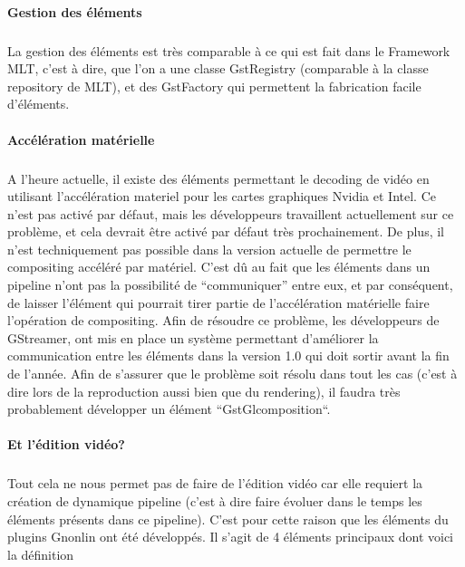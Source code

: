 \paragraph{Gestion des éléments}

\subparagraph{}

La gestion des éléments est très comparable à ce qui est fait dans le
Framework MLT, c'est à dire, que l'on a une classe GstRegistry
(comparable à la classe repository de MLT), et des GstFactory
qui permettent la fabrication facile d'éléments.

\paragraph{Accélération matérielle}

\subparagraph{}

A l'heure actuelle, il existe des éléments permettant le decoding de
vidéo en utilisant l'accélération materiel pour les cartes graphiques
Nvidia et Intel. Ce n'est pas activé par défaut, mais les développeurs
travaillent actuellement sur ce problème, et cela devrait être activé
par défaut très prochainement. De plus, il n'est techniquement
pas possible dans la version actuelle de permettre le compositing
accéléré par matériel. C'est dû au fait que les éléments
dans un pipeline n'ont pas la possibilité de ``communiquer'' entre eux,
et par conséquent, de laisser l'élément qui pourrait tirer partie de
l'accélération matérielle faire l'opération de compositing. Afin de
résoudre ce problème, les développeurs de GStreamer, ont mis en place
un système permettant d'améliorer la communication entre les éléments
dans la version 1.0 qui doit sortir avant la fin de l'année. Afin de
s'assurer que le problème soit résolu dans tout les cas (c'est à dire
lors de la reproduction aussi bien que du rendering), il faudra très
probablement développer un élément ``GstGlcomposition``.

\paragraph{Et l'édition vidéo?}

\subparagraph{}

Tout cela ne nous permet pas de faire de l'édition vidéo car elle
requiert la création de dynamique pipeline (c'est à dire faire évoluer
dans le temps les éléments présents dans ce pipeline). C'est pour cette
raison que les éléments du plugins Gnonlin ont été développés. Il
s'agit de 4 éléments principaux dont voici la définition

